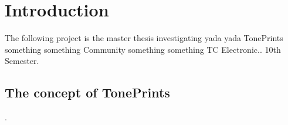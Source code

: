 \chapter{Introduction}
\label{Introduction}
The following project is the master thesis investigating yada yada TonePrints something something Community something something TC Electronic.. 10th Semester.

\section{The concept of TonePrints}
\label{TonePrints}


\parencite{WEB:AboutTonePrints}.